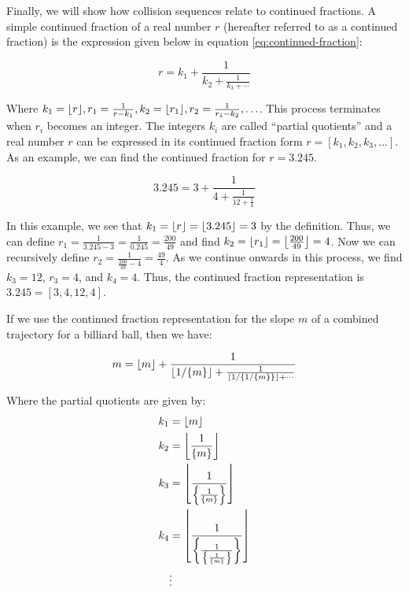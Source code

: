 Finally, we will show how collision sequences relate to continued fractions. A simple continued fraction of a real number $r$ (hereafter referred to as a continued fraction) is the expression given below in equation \ref{eq:continued-fraction}:

\begin{equation}
  \label{eq:continued-fraction}
  r = k_1 + \frac{1}{k_2 + \frac{1}{k_3 + \cdots}}
\end{equation}

Where $k_1 = \floor{r}, r_1 = \frac{1}{r-k_1}, k_2=\floor{r_1}, r_2 = \frac{1}{r_1-k_2}, \ldots$. This process terminates when $r_i$ becomes an integer. The integers $k_i$ are called ``partial quotients'' and a real number $r$ can be expressed in its continued fraction form $r = [k_1, k_2, k_3, \ldots]$. As an example, we can find the continued fraction for $r = 3.245$.

\begin{example}
  \begin{equation}
    3.245 = 3 + \frac{1}{4 + \frac{1}{12 + \frac{1}{4}}}
  \end{equation}

In this example, we see that $k_1 = \floor{r} = \floor{3.245} = 3$ by the definition. Thus, we can define $r_1 = \frac{1}{3.245 - 3} = \frac{1}{0.245} = \frac{200}{49}$ and find $k_2 = \floor{r_1} = \floor{\frac{200}{49}} = 4$. Now we can recursively define $r_2 = \frac{1}{\frac{200}{49} - 4} = \frac{49}{4}$. As we continue onwards in this process, we find $k_3 = 12$, $r_3 = 4$, and $k_4 = 4$. Thus, the continued fraction representation is $3.245 = [3,4,12,4]$.
\end{example}

If we use the continued fraction representation for the slope $m$ of a combined trajectory for a billiard ball, then we have:

\begin{equation}
  m = \floor{m} + \frac{1}{\floor{1 / \cbracket{m}} + \frac{1}{\floor{1/\cbracket{1/\cbracket{m}}} + \cdots}}
\end{equation}

Where the partial quotients are given by:
\begin{align*}
  k_1 &= \floor{m} \\
  k_2 &= \floor{\frac{1}{\cbracket{m}}} \\
  k_3 &= \floor{\frac{1}{\cbracket{ \frac{1}{\cbracket{m}}}}} \\
  k_4 &= \floor{\frac{1}{\cbracket{ \frac{1}{\cbracket{\frac{1}{\cbracket{m}}}}}}} \\
      &\vdots
\end{align*}

